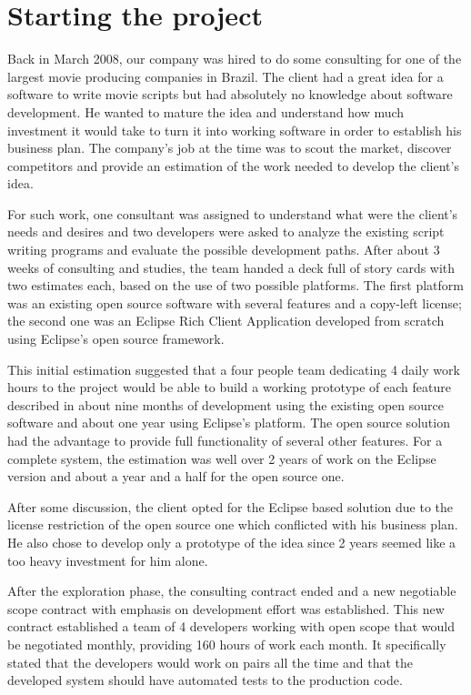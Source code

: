\documentclass[lnbip]{svmultln}
\begin{document}
\section{Starting the project}
\label{sec:start}

Back in March 2008, our company was hired to do some consulting for
one of the largest movie producing companies in Brazil. The client had
a great idea for a software to write movie scripts but had absolutely
no knowledge about software development.  He wanted to mature the idea
and understand how much investment it would take to turn it into
working software in order to establish his business plan. The
company's job at the time was to scout the market, discover
competitors and provide an estimation of the work needed to develop
the client's idea.

For such work, one consultant was assigned to understand what were the
client's needs and desires and two developers were asked to analyze
the existing script writing programs and evaluate the possible
development paths. After about 3 weeks of consulting and studies, the
team handed a deck full of story cards with two estimates each, based
on the use of two possible platforms. The first platform was an
existing open source software with several features and a copy-left
license; the second one was an Eclipse Rich Client Application
developed from scratch using Eclipse's open source framework.

This initial estimation suggested that a four people team dedicating 4 daily
work hours to the project would be able to build a working prototype of each
feature described in about nine months of development using the existing open
source software and about one year using Eclipse's platform. The open source
solution had the advantage to provide full functionality of several other
features. For a complete system, the estimation was well over 2 years of work on
the Eclipse version and about a year and a half for the open source one.

After some discussion, the client opted for the Eclipse based solution
due to the license restriction of the open source one which conflicted
with his business plan. He also chose to develop only a prototype of
the idea since 2 years seemed like a too heavy investment for him
alone.

After the exploration phase, the consulting contract ended and a new negotiable
scope contract\cite{tem citação pra esse tipo de contrato?} with emphasis on
development effort was established. This new contract established a team of 4
developers working with open scope that would be negotiated monthly, providing
160 hours of work each month. It specifically stated that the developers would
work on pairs all the time and that the developed system should have automated
tests to the production code.
\end{document}
